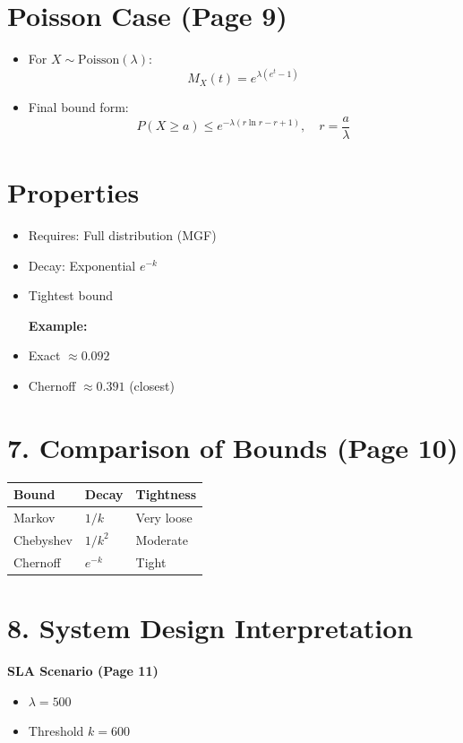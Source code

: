 \documentclass{article}
\begin{document}
\section*{Poisson Case (Page 9)}

\begin{itemize}
    \item For $X \sim \text{Poisson}(\lambda)$:
    \[M_X(t) = e^{\lambda (e^t - 1)}\]
    \item Final bound form:
    \[P(X \ge a) \le e^{-\lambda (r \ln r - r + 1)}, \quad r = \frac{a}{\lambda}\]
\end{itemize}

\section*{Properties}
\begin{itemize}
    \item Requires: Full distribution (MGF)
    \item Decay: Exponential $e^{-k}$
    \item Tightest bound
    
    \textbf{Example:}
    \item Exact $\approx 0.092$
    \item Chernoff $\approx 0.391$ (closest)
\end{itemize}

\section*{7. Comparison of Bounds (Page 10)}

\begin{tabular}{lll}
\toprule
\textbf{Bound} & \textbf{Decay} & \textbf{Tightness} \\
\midrule
Markov & $1/k$ & Very loose \\
Chebyshev & $1/k^2$ & Moderate \\
Chernoff & $e^{-k}$ & Tight \\
\bottomrule
\end{tabular}

\section*{8. System Design Interpretation}

\textbf{SLA Scenario (Page 11)}
\begin{itemize}
    \item $\lambda = 500$
    \item Threshold $k = 600$
\end{itemize}
\end{document}
